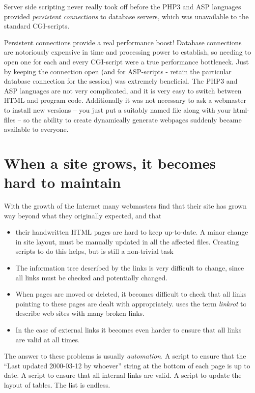 Server side scripting never really took off before the PHP3 and ASP
languages provided \textit{persistent connections} to database
servers, which was unavailable to the standard CGI-scripts.  

Persistent connections provide a real performance boost!  Database
connections are notoriously expensive in time and processing power to
establish, so needing to open one for each and every CGI-script were a
true performance bottleneck.  Just by keeping the connection open (and
for ASP-scripts - retain the particular database connection for the
session) was extremely beneficial.  The PHP3 and ASP languages are not
very complicated, and it is very easy to switch between HTML and
program code.  Additionally it was not necessary to ask a webmaster to
install new versions -- you just put a suitably named file along with
your html-files -- so the ability to create dynamically generate
webpages suddenly became available to everyone.


\section{When a site grows, it becomes hard to maintain}
\label{sec:when-a-site-grows-it-becomes-hard-to-maintain}

With the growth of the Internet many webmasters find that their site
has grown way beyond what they originally expected, and that

\begin{itemize}
\item their handwritten HTML pages are hard to keep up-to-date.  A
  minor change in site layout, must be manually updated in all the
  affected files.  Creating scripts to do this helps, but is still a
  non-trivial task
\item The information tree described by the links is very difficult to
  change, since all links must be checked and potentially changed.
\item When pages are moved or deleted, it becomes difficult to check
  that all links pointing to these pages are dealt with appropriately.
  uses the term \textit{linkrot} to describe web sites with many
  broken links.
\item In the case of external links it becomes even harder to ensure
  that all links are valid at all times.
\end{itemize}

The answer to these problems is usually \textit{automation}.  A script
to ensure that the  ``Last updated 2000-03-12 by whoever'' string at
the bottom of each page is up to date.   A script to ensure that all
internal links are valid.  A script to update the layout of tables.
The list is endless.


